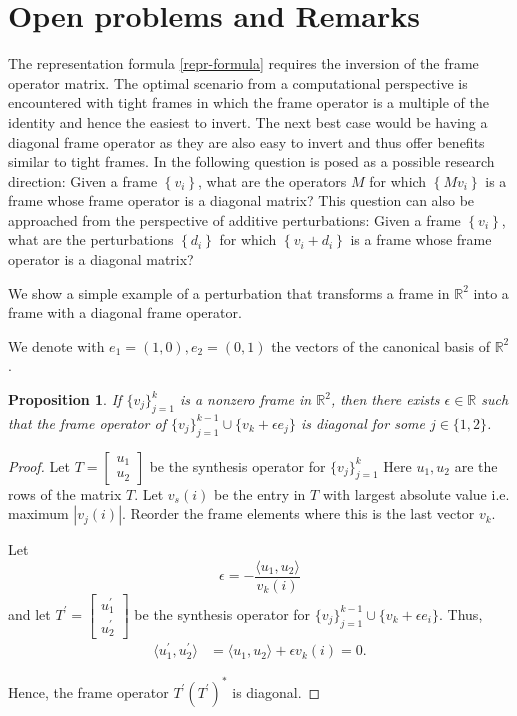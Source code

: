 \documentclass[11pt, reqno]{amsart}
\providecommand{\R}{\mathbb R}
\newtheorem{prop}[theorem]{Proposition}
\numberwithin{equation}{section}
\begin{document}
\section{Open problems and Remarks}
The representation formula \eqref{repr-formula}  requires the inversion of the frame operator matrix. The optimal scenario from a computational perspective is encountered with tight frames in which the frame operator is a multiple of the identity and hence the easiest to invert. The next best case would be having a diagonal frame operator as they are also easy to invert and thus offer benefits similar to tight frames. In \cite{Datta2017} the following question is posed as a possible research direction: Given a frame $\left\{ v_i \right\}$, what are the operators $M$ for which $\left\{M v_i\right\}$ is a frame whose frame operator is a diagonal matrix? This question can also be approached from the perspective of additive perturbations: Given a frame $\left\{ v_i \right\}$, what are the perturbations $\left\{ d_i \right\}$ for which $\left\{v_i + d_i\right\}$ is a frame whose frame operator is a diagonal matrix?

We show a simple example of a perturbation that transforms a frame in $\R^2$ into a frame with a diagonal frame operator. 

We denote with   $e_1=(1, 0), e_2=(0,1)$ the vectors of the canonical basis of $\R^2$.

\begin{prop}\label{prop:diagR2}
 If $\{v_j\}_{j=1}^k$ is a nonzero frame in $\R^2$, then there exists $\epsilon\in \R$ such that the frame operator of $\{v_j\}_{j=1}^{k-1}\cup \{v_k+\epsilon e_j\}$ is diagonal for some $j\in\{1, 2\}$. 
\end{prop}

\begin{proof}
	Let $T=\begin{bmatrix}
		u_1 \\ u_2
	\end{bmatrix}$ be the synthesis operator for $\{v_j\}_{j=1}^k$ 
Here  $u_1, u_2$ are the rows of the matrix $T $.
    Let $v_s(i)$ be the entry in $T$ with largest absolute value i.e. maximum $|v_j(i)|$. Reorder the frame elements where this is the last vector $v_k$.
    	
    	Let $$\epsilon= -\frac{\langle u_1, u_2\rangle}{v_k(i)} $$
    and let  $T^\prime =\begin{bmatrix}
        u_1^\prime \\ u_2^\prime
    \end{bmatrix}$ be the synthesis operator for $\{v_j\}_{j=1}^{k-1}\cup \{v_k+\epsilon e_i\}$. Thus, \begin{align*}
        \langle u_1^\prime, u_2^\prime \rangle &= \langle u_1, u_2\rangle + \epsilon v_k(i)=0.
    \end{align*}

    \noindent Hence, the frame operator $T^\prime(T^\prime)^*$ is diagonal.
\end{proof}
\end{document}
